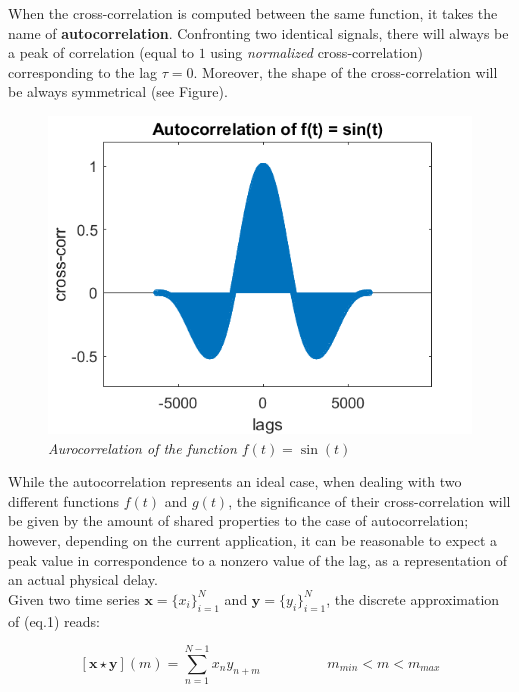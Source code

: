 \documentclass[a4paper]{article}
\begin{document}
When the cross-correlation is computed between the same function, it takes the name of \textbf{autocorrelation}. Confronting two identical signals, there will always be a peak of correlation (equal to $1$ using \textit{normalized} cross-correlation) corresponding to the lag $\tau = 0$. Moreover, the shape of the cross-correlation will be always symmetrical (see Figure).

\begin{figure}[H]
	\begin{center}
		\includegraphics[scale=.75]{autocorr.png} 
	\end{center} 
	\caption{\textit{Aurocorrelation of the function $ f(t) = \sin(t) $}}
	
\end{figure}


While the autocorrelation represents an ideal case, when dealing with two different functions $f(t)$ and $g(t)$, the significance of their cross-correlation will be given by the amount of shared properties to the case of autocorrelation; however, depending on the current application, it can be reasonable to expect a peak value in correspondence to a nonzero value of the lag, as a representation of an actual physical delay.
\\

Given two time series $ \textbf{x} = \{x_i\}_{i=1}^N$ and  $\textbf{y} = \{y_i\}_{i=1}^N$, the discrete approximation of (eq.1) reads:


$$ [\textbf{x} \star \textbf{y}] (m) =  \sum_{n=1}^{N-1} x_n y_{n+m} \hspace{2cm} m_{min} < m < m_{max} $$
\end{document}
